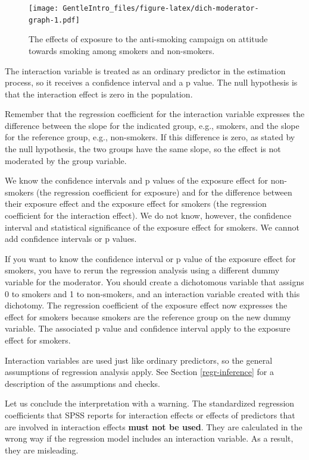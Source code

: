 \documentclass[a4paper]{book}
\theoremstyle{definition}
\theoremstyle{definition}
\theoremstyle{definition}
\theoremstyle{remark}
\begin{document}
\begin{figure}
\centering
\texttt{[image: GentleIntro\_files/figure-latex/dich-moderator-graph-1.pdf]}
\caption{\label{fig:dich-moderator-graph}The effects of exposure to the
anti-smoking campaign on attitude towards smoking among smokers and
non-smokers.}
\end{figure}

The interaction variable is treated as an ordinary predictor in the
estimation process, so it receives a confidence interval and a p value.
The null hypothesis is that the interaction effect is zero in the
population.

Remember that the regression coefficient for the interaction variable
expresses the difference between the slope for the indicated group,
e.g., smokers, and the slope for the reference group, e.g., non-smokers.
If this difference is zero, as stated by the null hypothesis, the two
groups have the same slope, so the effect is not moderated by the group
variable.

We know the confidence intervals and p values of the exposure effect for
non-smokers (the regression coefficient for exposure) and for the
difference between their exposure effect and the exposure effect for
smokers (the regression coefficient for the interaction effect). We do
not know, however, the confidence interval and statistical significance
of the exposure effect for smokers. We cannot add confidence intervals
or p values.

If you want to know the confidence interval or p value of the exposure
effect for smokers, you have to rerun the regression analysis using a
different dummy variable for the moderator. You should create a
dichotomous variable that assigns 0 to smokers and 1 to non-smokers, and
an interaction variable created with this dichotomy. The regression
coefficient of the exposure effect now expresses the effect for smokers
because smokers are the reference group on the new dummy variable. The
associated p value and confidence interval apply to the exposure effect
for smokers.

Interaction variables are used just like ordinary predictors, so the
general assumptions of regression analysis apply. See Section
\ref{regr-inference} for a description of the assumptions and checks.

Let us conclude the interpretation with a warning. The standardized
regression coefficients that SPSS reports for interaction effects or
effects of predictors that are involved in interaction effects
\textbf{must not be used}. They are calculated in the wrong way if the
regression model includes an interaction variable. As a result, they are
misleading.
\end{document}
